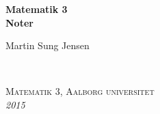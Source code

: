 \documentclass[11pt,fleqn]{book} %
\begin{document}
\let\cleardoublepage\clearpage


\begingroup
\thispagestyle{empty}
\centering
\vspace*{5cm}
\par\normalfont\fontsize{35}{35}\sffamily\selectfont
\textbf{Matematik 3 \\ Noter }\\
{\LARGE }\par %
\vspace*{1cm}
{\Huge Martin Sung Jensen}\par %
\endgroup


\newpage
~\vfill
\thispagestyle{empty}


\noindent \textsc{Matematik 3, Aalborg universitet}\\



\noindent \textit{2015} %



\pagestyle{empty} %

\renewcommand\contentsname{Indholdsfortegnelse}
\renewcommand{\bibname}{Litteratur}
\tableofcontents%


\pagestyle{fancy} %

\end{document}

